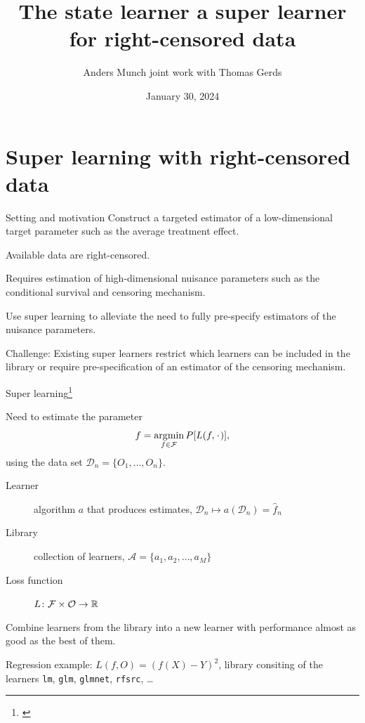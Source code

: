\documentclass[smaller]{beamer}\usepackage{listings}
\author{Anders Munch \newline \small joint work with Thomas Gerds}
\date{January 30, 2024}
\title{The state learner \newline \normalsize a super learner for right-censored data}
\begin{document}
\maketitle
\section{Super learning with right-censored data}
\label{sec:orgdd3c161}
\begin{frame}[label={sec:org7c16a81}]{Setting and motivation}
Construct a targeted estimator of a low-dimensional target parameter such as the
average treatment effect.

\vfill

Available data are right-censored.

\vfill

Requires estimation of high-dimensional nuisance parameters such as the
conditional survival and censoring mechanism.

\vfill

Use super learning to alleviate the need to fully pre-specify estimators of the
nuisance parameters.

\vfill

\color{bblue}Challenge\color{black}: Existing super learners restrict which
learners can be included in the library or require pre-specification of an
estimator of the censoring mechanism.
\end{frame}

\begin{frame}[label={sec:org539d390},fragile]{Super learning\footnote{\cite{stone1974cross,geisser1975predictive,wolpert1992stacked,breiman1996stacked,van2007super}}}
 \small

Need to estimate the parameter
\begin{equation*}
  f = \argmin_{f \in \mathcal{F}} P{[L(f, \blank)]}, 
\end{equation*}
using the data set \( \mathcal{D}_n = \{O_1, \dots, O_n\} \).

\vfill

\begin{description}
\item[{Learner}] algorithm \(a\) that produces estimates, \(\mathcal{D}_n \mapsto
  a(\mathcal{D}_n) = \hat f_n\)
\item[{Library}] collection of learners, \(\mathcal{A} = \{a_1, a_2, \dots, a_M
  \}\)
\item[{Loss function}] \(L \colon \mathcal{F} \times \mathcal{O} \rightarrow \mathbb{R}\)
\end{description}

\vfill

Combine learners from the library into a new learner with performance almost as
good as the best of them.

\vfill

\color{bblue}Regression example\color{black}: \(L(f, O) =(f(X) -Y)^2\),
library consiting of the learners \texttt{lm}, \texttt{glm}, \texttt{glmnet}, \texttt{rfsrc}, \ldots{}
\end{frame}
\end{document}
